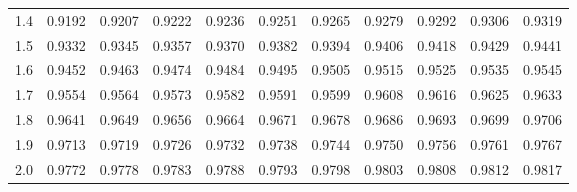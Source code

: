 \begin{center}
\begin{tabular}{c|cccccccccc}
	1.4 & 0.9192 & 0.9207 & 0.9222 & 0.9236 & 0.9251 & 0.9265 & 0.9279 & 0.9292 & 0.9306 & 0.9319 \\
	1.5 & 0.9332 & 0.9345 & 0.9357 & 0.9370 & 0.9382 & 0.9394 & 0.9406 & 0.9418 & 0.9429 & 0.9441 \\
	1.6 & 0.9452 & 0.9463 & 0.9474 & 0.9484 & 0.9495 & 0.9505 & 0.9515 & 0.9525 & 0.9535 & 0.9545 \\
	1.7 & 0.9554 & 0.9564 & 0.9573 & 0.9582 & 0.9591 & 0.9599 & 0.9608 & 0.9616 & 0.9625 & 0.9633 \\
	1.8 & 0.9641 & 0.9649 & 0.9656 & 0.9664 & 0.9671 & 0.9678 & 0.9686 & 0.9693 & 0.9699 & 0.9706 \\
	1.9 & 0.9713 & 0.9719 & 0.9726 & 0.9732 & 0.9738 & 0.9744 & 0.9750 & 0.9756 & 0.9761 & 0.9767 \\
	2.0 & 0.9772 & 0.9778 & 0.9783 & 0.9788 & 0.9793 & 0.9798 & 0.9803 & 0.9808 & 0.9812 & 0.9817 \\
	\bottomrule
\end{tabular}
\end{center}

